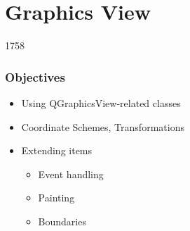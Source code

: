 %
%
%
%

\section{Graphics View}
\begin{slide}{1758}
\frametitle{Objectives}
\begin{itemize}
\item Using QGraphicsView-related classes
\item Coordinate Schemes, Transformations
\item Extending items
    \begin{itemize}
    \item Event handling
    \item Painting
    \item Boundaries
    \end{itemize}
\end{itemize}
\end{slide}

  


